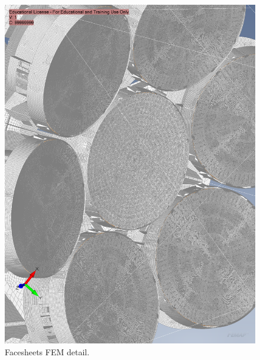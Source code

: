 \begin{figure}
  \centering
  \includegraphics[width=\textwidth]{FEM/facesheets.png}
  \caption{Facesheets FEM detail.}
  \label{fig:fem-facesheets}
\end{figure}

